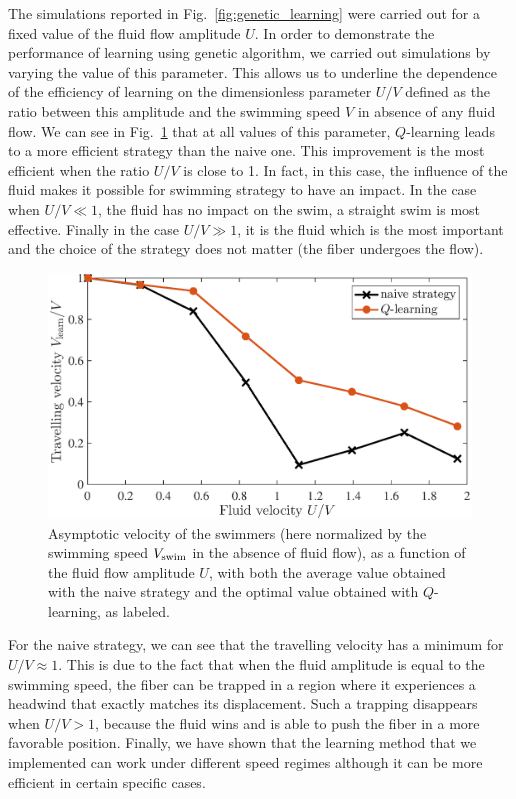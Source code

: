 \documentclass[aps,pre,reprint,superscriptaddress]{revtex4-2}
\begin{document}
The simulations reported in Fig.~\ref{fig:genetic_learning} were carried out for a fixed value of the fluid flow amplitude $U$. In order to demonstrate the performance of learning using genetic algorithm, we carried out simulations by varying the value of this parameter. This allows us to underline the dependence of the efficiency of learning on the dimensionless parameter $U/V$ defined as the ratio between this amplitude and the swimming speed $V$ in absence of any fluid flow. We can see in Fig.~\ref{fig:vel_VarU} that at all  values of this parameter, $Q$-learning leads to a more efficient strategy than the naive one. This improvement is the most efficient when the ratio $U/V$ is close to 1. In fact, in this case, the influence of the fluid makes it possible for swimming strategy to have an impact. In the case when $ U/V \ll 1$, the fluid has no impact on the swim, a straight swim is most effective. Finally in the case $ U/V\gg 1$, it is the fluid which is the most important and the choice of the strategy does not matter (the fiber undergoes the flow).



\begin{figure}[ht]
  \centerline{\includegraphics[width=\columnwidth]{vel_varU}}
  \caption{\label{fig:vel_VarU} Asymptotic velocity of the swimmers (here normalized by the swimming speed $V_{\rm swim}$ in the absence of fluid flow), as a function of the fluid flow amplitude $U$, with both the average value obtained with the naive strategy and the optimal value obtained with $Q$-learning, as labeled. }
\end{figure}

For the naive strategy, we can see that the travelling velocity has a minimum for $U/V\approx 1$. This is due to the fact that when the fluid amplitude is equal to the swimming speed, the fiber can be trapped in a region where it experiences a headwind that exactly matches its displacement. Such a trapping disappears when $U/V>1$, because the fluid wins and is able to push the fiber in a more favorable position.
Finally, we have shown that the learning method that we implemented can work under different speed regimes although it can be more efficient in certain specific cases.
\end{document}
